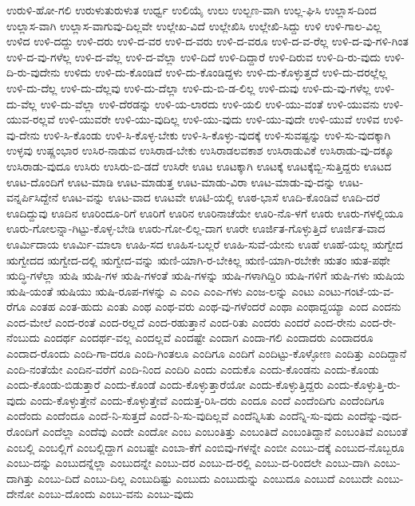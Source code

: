 {ಉರುಳಿ-ಹೋ-ಗಲಿ
ಉರುಳುತುರುಳುತ
ಉರ್ಧ್ವ
ಉಲಿಯೈ
ಉಲು
ಉಲ್ಬಣ-ವಾಗಿ
ಉಲ್ಲ-ಘಿಸಿ
ಉಲ್ಲಾಸ-ದಿಂದ
ಉಲ್ಲಾಸ-ವಾಗಿ
ಉಲ್ಲಾಸ-ವಾಗುವು-ದಿಲ್ಲವೇ
ಉಲ್ಲೇಖ-ವಿದೆ
ಉಲ್ಲೇಖಿಸಿ
ಉಲ್ಲೇಖಿ-ಸಿದ್ದು
ಉಳಿ
ಉಳಿ-ಗಾಲ-ವಿಲ್ಲ
ಉಳಿದ
ಉಳಿ-ದದ್ದು
ಉಳಿ-ದರು
ಉಳಿ-ದ-ವರ
ಉಳಿ-ದ-ವರು
ಉಳಿ-ದ-ವರೂ
ಉಳಿ-ದ-ವ-ರೆಲ್ಲ
ಉಳಿ-ದ-ವು-ಗಳಿ-ಗಿಂತ
ಉಳಿ-ದ-ವು-ಗಳೆಲ್ಲ
ಉಳಿ-ದ-ವೆಲ್ಲ
ಉಳಿ-ದ-ವೆಲ್ಲಾ
ಉಳಿ-ದಿದೆ
ಉಳಿ-ದಿದ್ದಾರೆ
ಉಳಿ-ದಿರುವ
ಉಳಿ-ದಿ-ರು-ವುದು
ಉಳಿ-ದಿ-ರು-ವುದೇನು
ಉಳಿದು
ಉಳಿ-ದು-ಕೊಂಡಿದೆ
ಉಳಿ-ದು-ಕೊಂಡಿದ್ದಳು
ಉಳಿ-ದು-ಕೊಳ್ಳುತ್ತದೆ
ಉಳಿ-ದು-ದರಲ್ಲೆಲ್ಲ
ಉಳಿ-ದು-ದೆಲ್ಲ
ಉಳಿ-ದು-ದೆಲ್ಲವು
ಉಳಿ-ದು-ದೆಲ್ಲಾ
ಉಳಿ-ದು-ಬಿ-ಡ-ಲಿಲ್ಲ
ಉಳಿ-ದುವು
ಉಳಿ-ದು-ವು-ಗಳೆಲ್ಲ
ಉಳಿ-ದು-ವೆಲ್ಲ
ಉಳಿ-ದು-ವೆಲ್ಲಾ
ಉಳಿ-ದೆರಡನ್ನು
ಉಳಿ-ಯ-ಲಾರದು
ಉಳಿ-ಯಲಿ
ಉಳಿ-ಯು-ವಂತೆ
ಉಳಿ-ಯುವನು
ಉಳಿ-ಯುವ-ರಲ್ಲವೆ
ಉಳಿ-ಯುವರೇ
ಉಳಿ-ಯು-ವುದಿಲ್ಲ
ಉಳಿ-ಯು-ವುದು
ಉಳಿ-ಯು-ವುದೇ
ಉಳಿ-ಯುವೆ
ಉಳಿವ
ಉಳಿ-ವು-ದೇನು
ಉಳಿ-ಸಿ-ಕೊಂಡು
ಉಳಿ-ಸಿ-ಕೊಳ್ಳ-ಬೇಕು
ಉಳಿ-ಸಿ-ಕೊಳ್ಳು-ವುದಕ್ಕೆ
ಉಳಿ-ಸುವಷ್ಟನ್ನು
ಉಳಿ-ಸು-ವುದಕ್ಕಾಗಿ
ಉಳ್ಳವು
ಉಷ್ಣಂಭಾರ
ಉಸಿರ-ನಾಡುವ
ಉಸಿರಾಡ-ಬೇಕು
ಉಸಿರಾಡಲವಕಾಶ
ಉಸಿರಾಡುವಿಕೆ
ಉಸಿರಾಡು-ವು-ದಕ್ಕೂ
ಉಸಿರಾಡು-ವುದೂ
ಉಸಿರು
ಉಸಿರು-ಬಿ-ಡದೆ
ಉಸಿರೇ
ಊಟ
ಊಟಕ್ಕಾಗಿ
ಊಟಕ್ಕೆ
ಊಟಕ್ಕೆಬ್ಬಿ-ಸುತ್ತಿದ್ದರು
ಊಟದ
ಊಟ-ದೊಂದಿಗೆ
ಊಟ-ಮಾಡಿ
ಊಟ-ಮಾಡುತ್ತ
ಊಟ-ಮಾಡು-ವಿರಾ
ಊಟ-ಮಾಡು-ವು-ದನ್ನು
ಊಟ-ವನ್ನರ್ಪಿಸಿದ್ದೇನೆ
ಊಟ-ವನ್ನು
ಊಟ-ವಾದ
ಊಟವೇ
ಊಟಿ-ಯಲ್ಲಿ
ಊಠ-ಭಾಸೆ
ಊದಿ-ಕೊಂಡಿವೆ
ಊದಿ-ದರೆ
ಊದಿದ್ದುವು
ಊದಿನ
ಊರಿಂದೂ-ರಿಗೆ
ಊರಿಗೆ
ಊರಿನ
ಊರಿನಾಚೆಯೇ
ಊರಿ-ನೊ-ಳಗೆ
ಊರು
ಊರು-ಗಳಲ್ಲಿಯೂ
ಊರು-ಗೋಲನ್ನಾ-ಗಿಟ್ಟು-ಕೊಳ್ಳ-ಬೇಡಿ
ಊರು-ಗೋ-ಲಿಲ್ಲ-ದಾಗ
ಊರೇ
ಊರ್ಜಿತ-ಗೊಳ್ಳುತ್ತಿದೆ
ಊರ್ಜಿತ-ವಾದ
ಊರ್ಮಿದಾಯ
ಊರ್ಮಿ-ಮಾಲಾ
ಊಹಿ-ಸದ
ಊಹಿಸ-ಬಲ್ಲರೆ
ಊಹಿ-ಸುವೆ-ಯೇನು
ಊಹೆ
ಊಹೆ-ಯಲ್ಲ
ಋಗ್ವೇದ
ಋಗ್ವೇದದ
ಋಗ್ವೇದ-ದಲ್ಲಿ
ಋಗ್ವೇದ-ವನ್ನು
ಋಣಿ-ಯಾಗಿ-ರ-ಬೇಕಿಲ್ಲ
ಋಣಿ-ಯಾಗಿ-ರಬೇಕೇ
ಋತಂ
ಋತ-ಪಥೇ
ಋದ್ಧಿ-ಗಳೆಲ್ಲಾ
ಋಷಿ
ಋಷಿ-ಗಳ
ಋಷಿ-ಗಳಂತೆ
ಋಷಿ-ಗಳನ್ನು
ಋಷಿ-ಗಳಾಗಿದ್ದಿರಿ
ಋಷಿ-ಗಳಿಗೆ
ಋಷಿ-ಗಳು
ಋಷಿಯ
ಋಷಿ-ಯಂತೆ
ಋಷಿಯು
ಋಷಿ-ರೂಪ-ಗಳನ್ನು
ಎ
ಎಂಎ
ಎಂಎ-ಗಳು
ಎಂಜ-ಲನ್ನು
ಎಂಟು
ಎಂಟು-ಗಂಟೆ-ಯ-ವ-ರೆಗೂ
ಎಂತಹ
ಎಂತ-ಹುದು
ಎಂತು
ಎಂಥ
ಎಂಥ-ವರು
ಎಂಥ-ವು-ಗಳೆಂದರೆ
ಎಂಥಾ
ಎಂಥಾದ್ದಯ್ಯಾ
ಎಂದ
ಎಂದನು
ಎಂದ-ಮೇಲೆ
ಎಂದ-ರಂತೆ
ಎಂದ-ರಲ್ಲದೆ
ಎಂದ-ರಹುತ್ತಾನೆ
ಎಂದ-ರಿತು
ಎಂದರು
ಎಂದರೆ
ಎಂದ-ರೇನು
ಎಂದ-ರೇ-ನೆಂಬುದು
ಎಂದರ್ಥ
ಎಂದರ್ಥ-ವಲ್ಲ
ಎಂದಲ್ಲವೆ
ಎಂದಷ್ಟೇ
ಎಂದಾಗ
ಎಂದಾ-ಗಲಿ
ಎಂದಾದರು
ಎಂದಾದರೂ
ಎಂದಾದ-ರೊಂದು
ಎಂದಿ-ಗಾ-ದರೂ
ಎಂದಿ-ಗಿಂತಲೂ
ಎಂದಿಗೂ
ಎಂದಿಗೆ
ಎಂದಿಟ್ಟು-ಕೊಳ್ಳೋಣ
ಎಂದಿತ್ತು
ಎಂದಿದ್ದಾನೆ
ಎಂದಿ-ನಂತೆಯೇ
ಎಂದಿನ-ವರೆಗೆ
ಎಂದಿ-ನಿಂದ
ಎಂದಿರಿ
ಎಂದು
ಎಂದುಕೊ
ಎಂದು-ಕೊಂಡನು
ಎಂದು-ಕೊಂಡು
ಎಂದು-ಕೊಂಡು-ಬಿಡುತ್ತಾರೆ
ಎಂದು-ಕೊಂಡೆ
ಎಂದು-ಕೊಳ್ಳುತ್ತಾರೆಯೋ
ಎಂದು-ಕೊಳ್ಳುತ್ತಿದ್ದರು
ಎಂದು-ಕೊಳ್ಳುತ್ತಿ-ರು-ವುದು
ಎಂದು-ಕೊಳ್ಳುತ್ತೇನೆ
ಎಂದು-ಕೊಳ್ಳುತ್ತೇವೆ
ಎಂದುತ್ತ-ರಿಸಿ-ದರು
ಎಂದೂ
ಎಂದೆ
ಎಂದೆಂದಿಗು
ಎಂದೆಂದಿಗೂ
ಎಂದೆಂದು
ಎಂದೆಂದೂ
ಎಂದೆ-ನಿ-ಸುತ್ತದೆ
ಎಂದೆ-ನಿ-ಸು-ವುದಿಲ್ಲವೆ
ಎಂದೆನ್ನಿಸಿತು
ಎಂದೆನ್ನಿ-ಸು-ವುದು
ಎಂದೆನ್ನು-ವುದ-ರೊಂದಿಗೆ
ಎಂದೆಲ್ಲಾ
ಎಂದೆವು
ಎಂದೇ
ಎಂದೋ
ಎಂಬ
ಎಂಬಂತಿತ್ತು
ಎಂಬಂತಿದೆ
ಎಂಬಂತಿದ್ದಾನೆ
ಎಂಬಂತಿವೆ
ಎಂಬಂತೆ
ಎಂಬಲ್ಲಿ
ಎಂಬಲ್ಲಿಗೆ
ಎಂಬಲ್ಲಿದ್ದಾಗ
ಎಂಬಷ್ಟೇ
ಎಂಬಾ-ಕೆಗೆ
ಎಂಬಿವು-ಗಳನ್ನೇ
ಎಂಬೀ
ಎಂಬು-ದಕ್ಕೆ
ಎಂಬುದ-ನೊಬ್ಬರೂ
ಎಂಬು-ದನ್ನು
ಎಂಬುದನ್ನೆಲ್ಲಾ
ಎಂಬುದನ್ನೇ
ಎಂಬು-ದರ
ಎಂಬು-ದ-ರಲ್ಲಿ
ಎಂಬು-ದ-ರಿಂದಲೇ
ಎಂಬು-ದಾಗಿ
ಎಂಬು-ದಾಗಿತ್ತು
ಎಂಬು-ದಿದೆ
ಎಂಬು-ದಿಲ್ಲ
ಎಂಬುದಿಷ್ಟು
ಎಂಬುದು
ಎಂಬುದುನ್ನು
ಎಂಬುದೂ
ಎಂಬುದೆ
ಎಂಬುದೇ
ಎಂಬು-ದೇನೋ
ಎಂಬು-ದೊಂದು
ಎಂಬು-ವನು
ಎಂಬು-ವುದು
}
